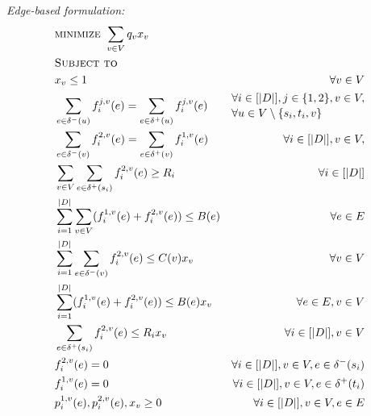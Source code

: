  \begin{minipage}[t]{0.55\textwidth}
\textit{Edge-based formulation:}
\small
  \begin{subequations}
\begin{align*}
&\textsc{minimize } \sum_{v \in V} q_v x_v\\
&\textsc{Subject to}\\
&x_v \leq 1 &\forall v \in V\\
&\sum\limits_{e \in \delta^-(u)}  f_i^{j,v}(e)=  \sum\limits_{e \in \delta^+(u)} f_i^{j,v}(e)
&\begin{aligned} 
&\forall i \in [|D|], j \in \{1,2\}, v \in V,\\[-.1\baselineskip]
&\forall u \in V \setminus \{s_i,t_i,v\}
\end{aligned}\\
&\sum\limits_{e \in \delta^-(v)}  f_i^{2,v}(e)=  \sum\limits_{e \in \delta^+(v)} f_i^{1,v}(e) 
&\forall i \in [|D|], v \in V,\\
&\sum\limits_{v \in V} \sum\limits_{e \in \delta^+(s_i)} f_i^{2,v}(e) \geq R_i &\forall i \in [|D|]\\
&\sum\limits_{i=1}^{|D|} \sum\limits_{v \in V} (f_i^{1,v}(e) + f_i^{2,v}(e))\leq B(e) &\forall e \in E\\
&\sum\limits_{i=1}^{|D|}  \sum\limits_{e \in \delta^-(v)}  f_i^{2,v}(e) \leq C(v)x_v &\forall v \in V\\
&\sum\limits_{i=1}^{|D|} (f_i^{1,v}(e) + f_i^{2,v}(e)) \leq B(e) x_v &\forall e \in E, v \in V\\
&\sum\limits_{e \in \delta^+(s_i)} f_i^{2,v}(e) \leq R_i x_v &\forall i \in [|D|], v \in V\\
&f_i^{2,v}(e)= 0&\forall i \in [|D|], v \in V, e \in \delta^-(s_i) \\
&f_i^{1,v}(e)= 0&\forall i \in [|D|], v \in V, e \in \delta^+(t_i) \\
&p_i^{1,v}(e), p_i^{2,v}(e), x_v \geq 0&\forall i \in [|D|], v \in V, e \in E 
\end{align*}
\end{subequations}
\normalsize
\end{minipage}

 \ \\

